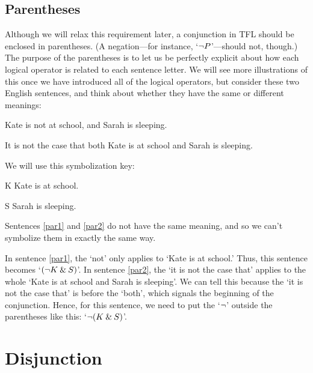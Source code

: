 \subsection{Parentheses}

Although we will relax this requirement later, a conjunction in TFL should be enclosed in parentheses. (A negation---for instance, `${\neg} P$'---should not, though.) The purpose of the parentheses is to let us be perfectly explicit about how each logical operator is related to each sentence letter. We will see more illustrations of this once we have introduced all of the logical operators, but consider these two English sentences, and think about whether they have the same or different meanings:
\begin{earg}
	\item[\ex{par1}] Kate is not at school, and Sarah is sleeping.
	\item[\ex{par2}] It is not the case that both Kate is at school and Sarah is sleeping.
\end{earg}
We will use this symbolization key:
	\begin{ekey}
		\item[K] Kate is at school.
		\item[S] Sarah is sleeping.
	\end{ekey}
Sentences \ref{par1} and \ref{par2} do not have the same meaning, and so we can't symbolize them in exactly the same way.

In sentence \ref{par1}, the `not' only applies to `Kate is at school.' Thus, this sentence becomes `$({\neg} K \mathbin{\&} S)$'. In sentence \ref{par2}, the `it is not the case that' applies to the whole `Kate is at school and Sarah is sleeping'. We can tell this because the `it is not the case that' is before the `both', which signals the beginning of the conjunction. Hence, for this sentence, we need to put the `${\neg}$' outside the parentheses like this: `${\neg} (K \mathbin{\&} S)$'.


\section{Disjunction}
\label{s:ConnectiveDisjunction}


